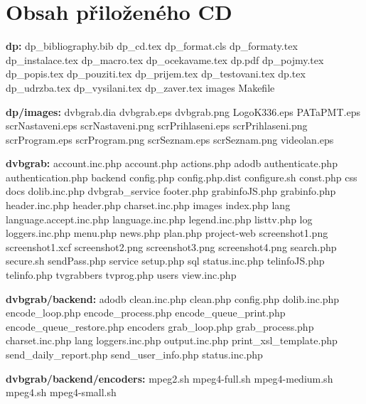 \chapter{Obsah přiloženého CD}

\vspace{10pt}

\textbf{dp:}
dp\_bibliography.bib
dp\_cd.tex
dp\_format.cls
dp\_formaty.tex
dp\_instalace.tex
dp\_macro.tex
dp\_ocekavame.tex
dp.pdf
dp\_pojmy.tex
dp\_popis.tex
dp\_pouziti.tex
dp\_prijem.tex
dp\_testovani.tex
dp.tex
dp\_udrzba.tex
dp\_vysilani.tex
dp\_zaver.tex
images
Makefile

\vspace{10pt}

\textbf{dp/images:}
dvbgrab.dia
dvbgrab.eps
dvbgrab.png
LogoK336.eps
PATaPMT.eps
scrNastaveni.eps
scrNastaveni.png
scrPrihlaseni.eps
scrPrihlaseni.png
scrProgram.eps
scrProgram.png
scrSeznam.eps
scrSeznam.png
videolan.eps

\vspace{10pt}

\textbf{dvbgrab:}
account.inc.php
account.php
actions.php
adodb
authenticate.php
authentication.php
backend
config.php
config.php.dist
configure.sh
const.php
css
docs
dolib.inc.php
dvbgrab\_service
footer.php
grabinfoJS.php
grabinfo.php
header.inc.php
header.php
charset.inc.php
images
index.php
lang
language.accept.inc.php
language.inc.php
legend.inc.php
listtv.php
log
loggers.inc.php
menu.php
news.php
plan.php
project-web
screenshot1.png
screenshot1.xcf
screenshot2.png
screenshot3.png
screenshot4.png
search.php
secure.sh
sendPass.php
service
setup.php
sql
status.inc.php
telinfoJS.php
telinfo.php
tvgrabbers
tvprog.php
users
view.inc.php

\vspace{10pt}

\textbf{dvbgrab/backend:}
adodb
clean.inc.php
clean.php
config.php
dolib.inc.php
encode\_loop.php
encode\_process.php
encode\_queue\_print.php
encode\_queue\_restore.php
encoders
grab\_loop.php
grab\_process.php
charset.inc.php
lang
loggers.inc.php
output.inc.php
print\_xsl\_template.php
send\_daily\_report.php
send\_user\_info.php
status.inc.php

\vspace{10pt}

\textbf{dvbgrab/backend/encoders:}
mpeg2.sh
mpeg4-full.sh
mpeg4-medium.sh
mpeg4.sh
mpeg4-small.sh

\vspace{10pt}

